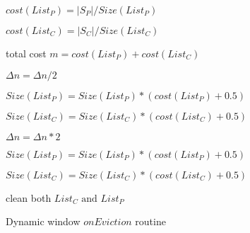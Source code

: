 \begin{algorithm}[htbp]
    \DontPrintSemicolon

    $cost(List_P) = |S_P| / Size(List_P)$      
    
    $cost(List_C) = |S_C| / Size(List_C)$     


    total cost $ m = cost(List_P) + cost(List_C)$  
  
    {
    
        $\Delta n = \Delta n / 2 $ 
        
        $Size(List_P) = Size(List_P) * (cost(List_P) + 0.5)$  

        $Size(List_C) = Size(List_C) * (cost(List_C) + 0.5)$  
    }
    {
   
        $\Delta n = \Delta n * 2$ 

        $Size(List_P) = Size(List_P) * (cost(List_P) + 0.5)$  

        $Size(List_C) = Size(List_C) * (cost(List_C) + 0.5)$  
    }

    clean both $List_C \text{ and } List_P$
    \caption{Dynamic window $onEviction$ routine}
    \label{alg:dynamic_eviction}
\end{algorithm}



